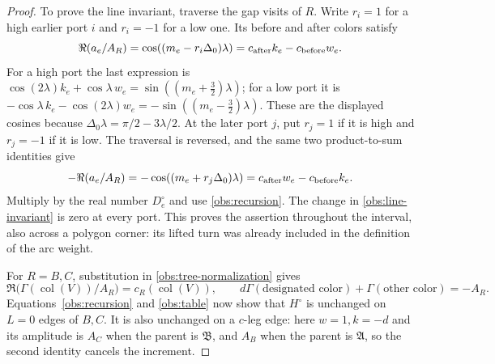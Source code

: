 \begin{proof}
To prove the line invariant, traverse the gap visits of $R$.  Write
$r_i=1$ for a high earlier port $i$ and $r_i=-1$ for a low one.
Its before and after colors satisfy
\begin{equation}
 \Re(a_e/A_R)=\cos((m_e-r_i\Delta_0)\lambda)
       =c_{\rm after}k_e-c_{\rm before}w_e.
 \label{obs:early-port}
\end{equation}
For a high port the last expression is
$\cos(2\lambda)k_e+\cos\lambda\,w_e
 =\sin((m_e+\tfrac32)\lambda)$;
for a low port it is
$-\cos\lambda\,k_e-\cos(2\lambda)w_e
 =-\sin((m_e-\tfrac32)\lambda)$.
These are the displayed cosines because
$\Delta_0\lambda=\pi/2-3\lambda/2$.
At the later port $j$, put $r_j=1$ if it is high and $r_j=-1$ if
it is low.  The traversal is reversed, and the same two
product-to-sum identities give
\begin{equation}
 -\Re(a_e/A_R)=-\cos((m_e+r_j\Delta_0)\lambda)
       =c_{\rm after}w_e-c_{\rm before}k_e.
 \label{obs:late-port}
\end{equation}
Multiply by the real number $D_e^\circ$ and use
\eqref{obs:recursion}.  The change in \eqref{obs:line-invariant}
is zero at every port.  This proves the assertion throughout the
interval, also across a polygon corner: its lifted turn was already
included in the definition of the arc weight.

For $R=B,C$, substitution in \eqref{obs:tree-normalization} gives
\begin{equation}
 \Re\bigl(\Gamma(\operatorname{col}(V))/A_R\bigr)
 =c_R(\operatorname{col}(V)),\qquad
 d\Gamma(\text{designated color})+\Gamma(\text{other color})=-A_R.
 \label{obs:gamma-identities}
\end{equation}
Equations~\eqref{obs:recursion} and \eqref{obs:table} now show that
$H^\circ$ is unchanged on $L=0$ edges of $B,C$.  It is also
unchanged on a $c$-leg edge: here $w=1,k=-d$ and its amplitude is
$A_C$ when the parent is $\mathfrak B$, and $A_B$ when the parent
is $\mathfrak A$, so the second identity cancels the increment.


\end{proof}
